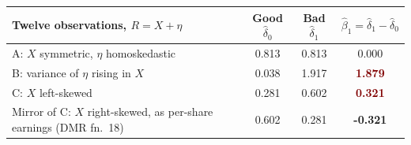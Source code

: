 \begin{tabular}{@{}lccc@{}}
\toprule
Twelve observations, $R = X + \eta$ & Good $\hat\delta_0$ & Bad $\hat\delta_1$ & $\hat\beta_1 = \hat\delta_1 - \hat\delta_0$ \\
\midrule
A: $X$ symmetric, $\eta$ homoskedastic & 0.813 & 0.813 & 0.000 \\
B: variance of $\eta$ rising in $X$ & 0.038 & 1.917 & \textcolor{Maroon}{\bfseries 1.879} \\
C: $X$ left-skewed & 0.281 & 0.602 & \textcolor{Maroon}{\bfseries 0.321} \\
Mirror of C: $X$ right-skewed, as per-share earnings (DMR fn.~18) & 0.602 & 0.281 & \textcolor{DeepNavy}{\bfseries -0.321} \\
\bottomrule
\end{tabular}
